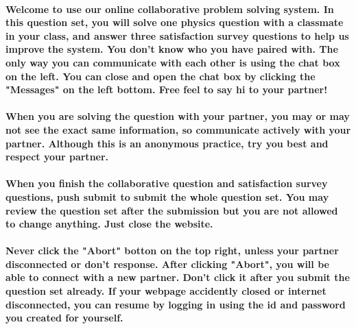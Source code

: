 \paragraph{Welcome to use our online collaborative problem solving system. In this question set, you will solve one physics question with a classmate in your class, and answer three satisfaction survey questions to help us improve the system. You don’t know who you have paired with. The only way you can communicate with each other is using the chat box on the left. You can close and open the chat box by clicking the "Messages" on the left bottom. Free feel to say hi to your partner!\newline}
\paragraph{When you are solving the question with your partner, you may or may not see the exact same information, so communicate actively with your partner. Although this is an anonymous practice, try you best and respect your partner.\newline}
\paragraph{When you ﬁnish the collaborative question and satisfaction survey questions, push submit to submit the whole question set. You may review the question set after the submission but you are not allowed to change anything. Just close the website.\newline}
\paragraph{Never click the "Abort" botton on the top right, unless your partner disconnected or don’t response. After clicking "Abort", you will be able to connect with a new partner. Don’t click it after you submit the question set already. If your webpage accidently closed or internet disconnected, you can resume by logging in using the id and password you created for yourself.\newline}




